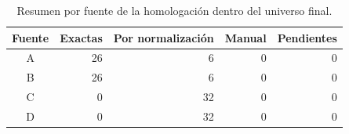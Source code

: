 \begin{table}[htbp]
\centering
\footnotesize
\caption{Resumen por fuente de la homologación dentro del universo final.}
\begin{tabular}{|c|r|r|r|r|}
\hline
Fuente & Exactas & Por normalización & Manual & Pendientes \\
\hline
A & 26 & 6 & 0 & 0 \\
B & 26 & 6 & 0 & 0 \\
C & 0 & 32 & 0 & 0 \\
D & 0 & 32 & 0 & 0 \\
\hline
\end{tabular}
\end{table}
